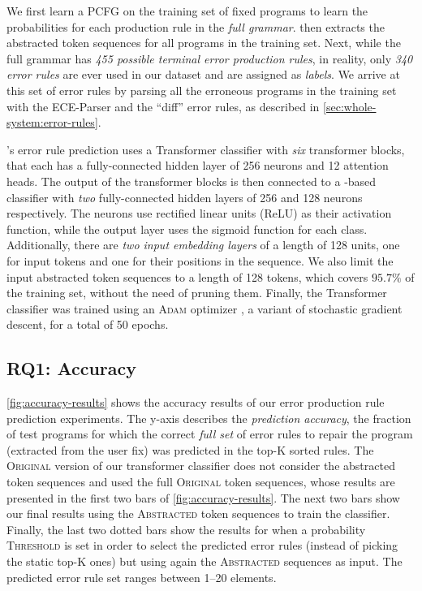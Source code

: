 We first learn a PCFG on the training set of fixed programs to learn the
probabilities for each production rule in the \emph{full \python grammar}.
\toolname then extracts the abstracted token sequences for all programs in the
training set. Next, while the full \python grammar has \emph{455 possible
terminal error production rules}, in reality, only \emph{340 error rules} are
ever used in our dataset and are assigned as \emph{labels}. We arrive at this
set of error rules by parsing all the erroneous programs in the training set
with the ECE-Parser and the ``diff'' error rules, as described in
\autoref{sec:whole-system:error-rules}.

\toolname's error rule prediction uses a Transformer classifier with \emph{six}
transformer blocks, that each has a fully-connected hidden layer of 256 neurons
and 12 attention heads. The output of the transformer blocks is then connected
to a \dnn-based classifier with \emph{two} fully-connected hidden layers of 256
and 128 neurons respectively. The neurons use rectified linear units (ReLU) as
their activation function, while the output layer uses the sigmoid function for
each class. Additionally, there are \emph{two input embedding layers} of a
length of 128 units, one for input tokens and one for their positions in the
sequence. We also limit the input abstracted token sequences to a length of 128
tokens, which covers $95.7\%$ of the training set, without the need of pruning
them. Finally, the Transformer classifier was trained using an \textsc{Adam}
optimizer \citep{Kingma2014-ng}, a variant of stochastic gradient descent, for a
total of 50 epochs.

\subsection{RQ1: Accuracy}
\label{sec:eval:accuracy}



\autoref{fig:accuracy-results} shows the accuracy results of our error
production rule prediction experiments. The y-axis describes the
\emph{prediction accuracy}, \ie the fraction of test programs for which the
correct \emph{full set} of error rules to repair the program (extracted from
the user fix) was predicted in the top-K sorted rules.
%
The \textsc{Original} version of our transformer classifier does not consider
the abstracted token sequences and used the full \textsc{Original} token
sequences, whose results are presented in the first two bars of
\autoref{fig:accuracy-results}. The next two bars show our final results using
the \textsc{Abstracted} token sequences to train the classifier. Finally, the
last two dotted bars show the results for when a probability \textsc{Threshold}
is set in order to select the predicted error rules (instead of picking the
static top-K ones) but using again the \textsc{Abstracted} sequences as input.
The predicted error rule set ranges between 1--20 elements.

